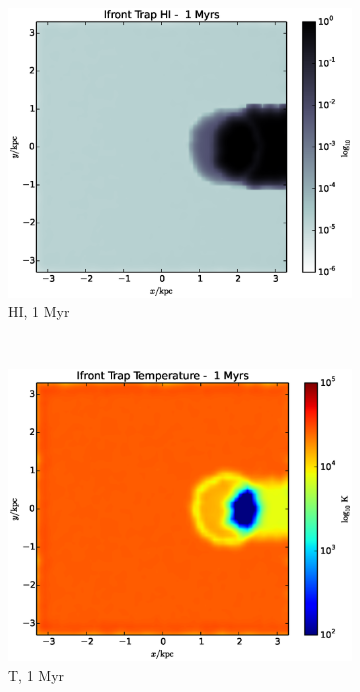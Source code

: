 \begin{figure}
        \centering
        \begin{subfigure}[b]{0.3\textwidth}
                \includegraphics[width=\textwidth]{graphics/ifrontTrap00010HI.eps}
                \caption{HI, 1 Myr}
                \label{fig:ifronttrap1a}
        \end{subfigure}
        ~ 
        \begin{subfigure}[b]{0.3\textwidth}
                \includegraphics[width=\textwidth]{graphics/ifrontTrap00010Temp.eps}
                \caption{T, 1 Myr}
                \label{fig:ifronttrap1b}
        \end{subfigure}
        \caption[]{}
        \label{fig:ifronttrap1}
\end{figure}

